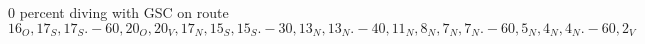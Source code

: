 
\begin{figure}
\label{tik:0:16_O, 17_S, 17_S.-60, 20_O, 20_V, 17_N, 15_S, 15_S.-30, 13_N, 13_N.-40, 11_N, 8_N, 7_N, 7_N.-60, 5_N, 4_N, 4_N.-60, 2_V}
\caption{0 percent diving with GSC on route $16_O, 17_S, 17_S.-60, 20_O, 20_V, 17_N, 15_S, 15_S.-30, 13_N, 13_N.-40, 11_N, 8_N, 7_N, 7_N.-60, 5_N, 4_N, 4_N.-60, 2_V$}
\end{figure}
